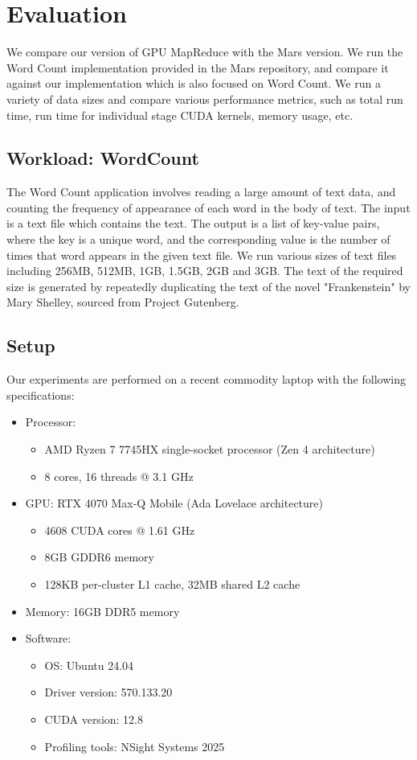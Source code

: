 \documentclass{article}
\begin{document}
\section{Evaluation}
We compare our version of GPU MapReduce with the Mars version. We run the Word Count implementation provided in the Mars repository, and compare it against our implementation which is also focused on Word Count. We run a variety of data sizes and compare various performance metrics, such as total run time, run time for individual stage CUDA kernels, memory usage, etc.

\subsection{Workload: WordCount}
The Word Count application involves reading a large amount of text data, and counting the frequency of appearance of each word in the body of text. The input is a text file which contains the text. The output is a list of key-value pairs, where the key is a unique word, and the corresponding value is the number of times that word appears in the given text file. We run various sizes of text files including 256MB, 512MB, 1GB, 1.5GB, 2GB and 3GB. The text of the required size is generated by repeatedly duplicating the text of the novel "Frankenstein" by Mary Shelley, sourced from Project Gutenberg.  

\subsection{Setup}
Our experiments are performed on a recent commodity laptop with the following specifications:
\begin{itemize}
    \item Processor: 
    \begin{itemize}
       \item AMD Ryzen 7 7745HX single-socket processor (Zen 4 architecture)
       \item 8 cores, 16 threads @ 3.1 GHz
    \end{itemize}
    \item GPU:  RTX 4070 Max-Q Mobile (Ada Lovelace architecture)
    \begin{itemize}
        \item 4608 CUDA cores @ 1.61 GHz
        \item 8GB GDDR6 memory
        \item 128KB per-cluster L1 cache, 32MB shared L2 cache
    \end{itemize}
    \item Memory: 16GB DDR5 memory
    \item Software:
    \begin{itemize}
        \item OS: Ubuntu 24.04
        \item  Driver version: 570.133.20
        \item CUDA version: 12.8
        \item Profiling tools:  NSight Systems 2025
    \end{itemize}
\end{itemize}
\end{document}
